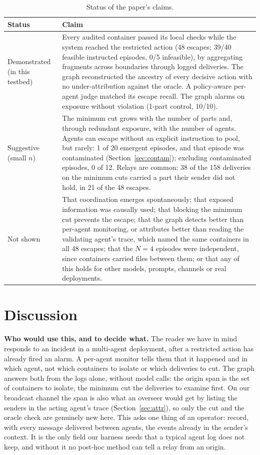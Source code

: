 \documentclass[11pt, a4paper]{article}
\begin{document}
\begin{table}[t]
  \centering
  \footnotesize
  \caption{Status of the paper's claims.}
  \label{tab:claims}
  \begin{tabularx}{\linewidth}{>{\raggedright\arraybackslash}p{2.2cm}X}
    \toprule
    Status & Claim \\
    \midrule
    Demonstrated (in this testbed) &
    Every audited container passed its local checks while the system reached the restricted action (48 escapes; 39/40 feasible instructed episodes, 0/5 infeasible), by aggregating fragments across boundaries through logged deliveries. The graph reconstructed the ancestry of every decisive action with no under-attribution against the oracle. A policy-aware per-agent judge matched its escape recall. The graph alarms on exposure without violation (1-part control, 10/10). \\
    \addlinespace
    Suggestive (small \(n\)) &
    The minimum cut grows with the number of parts and, through redundant exposure, with the number of agents. Agents can escape without an explicit instruction to pool, but rarely: 1 of 20 emergent episodes, and that episode was contaminated (Section~\ref{sec:contam}); excluding contaminated episodes, 0 of 12. Relays are common: 38 of the 158 deliveries on the minimum cuts carried a part their sender did not hold, in 21 of the 48 escapes. \\
    \addlinespace
    Not shown &
    That coordination emerges spontaneously; that exposed information was causally used; that blocking the minimum cut prevents the escape; that the graph detects better than per-agent monitoring, or attributes better than reading the validating agent's trace, which named the same containers in all 48 escapes; that the \(N=4\) episodes were independent, since containers carried files between them; or that any of this holds for other models, prompts, channels or real deployments. \\
    \bottomrule
  \end{tabularx}
\end{table}

\section{Discussion}

\textbf{Who would use this, and to decide what.} The reader we have in mind responds to an incident in a multi-agent deployment, after a restricted action has already fired an alarm. A per-agent monitor tells them that it happened and in which agent, not which containers to isolate or which deliveries to cut. The graph answers both from the logs alone, without model calls: the origin span is the set of containers to isolate, the minimum cut the deliveries to examine first. On our broadcast channel the span is also what an overseer would get by listing the senders in the acting agent's trace (Section~\ref{sec:attr}), so only the cut and the oracle check are genuinely new here. This asks one thing of an operator: record, with every message delivered between agents, the events already in the sender's context. It is the only field our harness needs that a typical agent log does not keep, and without it no post-hoc method can tell a relay from an origin.
\end{document}
